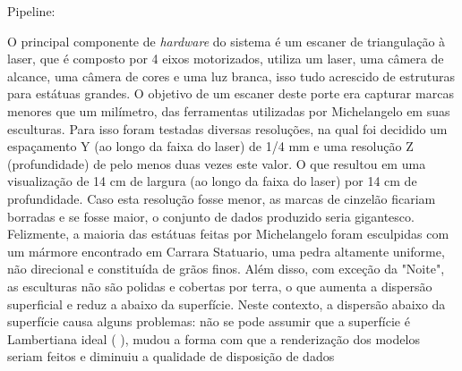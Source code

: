 Pipeline:

O principal componente de {\it hardware} do sistema é um escaner de triangulação à laser, que é composto por 4 eixos motorizados, utiliza um laser, uma câmera de alcance, uma câmera de cores e uma luz branca, isso tudo acrescido de estruturas para estátuas grandes. O objetivo de um escaner deste porte era capturar marcas menores que um milímetro, das ferramentas utilizadas por Michelangelo em suas esculturas. 
Para isso foram testadas diversas resoluções, na qual foi decidido um espaçamento Y (ao longo da faixa do laser) de 1/4 mm e uma resolução Z (profundidade) de pelo menos duas vezes este valor. O que resultou em uma visualização de 14 cm de largura (ao longo da faixa do laser) por 14 cm de profundidade. Caso esta resolução fosse menor, as marcas de cinzelão ficariam borradas e se fosse maior, o conjunto de dados produzido seria gigantesco.
Felizmente, a maioria das estátuas feitas por Michelangelo foram esculpidas com um mármore encontrado em Carrara Statuario, uma pedra altamente uniforme, não direcional e constituída de grãos finos. Além disso, com exceção da "Noite", as esculturas não são polidas e cobertas por terra, o que aumenta a dispersão superficial e reduz a abaixo da superfície.
Neste contexto, a dispersão abaixo da superfície causa alguns problemas: não se pode assumir que a superfície é Lambertiana ideal (%
), mudou a forma com que a renderização dos modelos seriam feitos e diminuiu a qualidade de disposição de dados 






